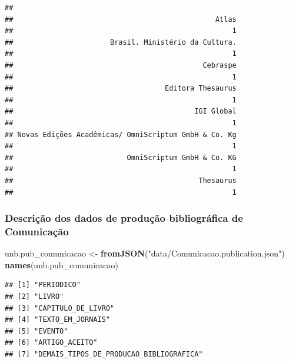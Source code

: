 \documentclass[]{article}
\newenvironment{Shaded}{\begin{snugshade}}{\end{snugshade}}
\newcommand{\KeywordTok}[1]{\textcolor[rgb]{0.13,0.29,0.53}{\textbf{#1}}}
\newcommand{\DataTypeTok}[1]{\textcolor[rgb]{0.13,0.29,0.53}{#1}}
\newcommand{\DecValTok}[1]{\textcolor[rgb]{0.00,0.00,0.81}{#1}}
\newcommand{\StringTok}[1]{\textcolor[rgb]{0.31,0.60,0.02}{#1}}
\newcommand{\OtherTok}[1]{\textcolor[rgb]{0.56,0.35,0.01}{#1}}
\newcommand{\OperatorTok}[1]{\textcolor[rgb]{0.81,0.36,0.00}{\textbf{#1}}}
\newcommand{\NormalTok}[1]{#1}
\begin{document}
\begin{Shaded}
\end{Shaded}

\begin{verbatim}
## 
##                                                Atlas 
##                                                    1 
##                       Brasil. Ministério da Cultura. 
##                                                    1 
##                                             Cebraspe 
##                                                    1 
##                                    Editora Thesaurus 
##                                                    1 
##                                           IGI Global 
##                                                    1 
## Novas Edições Acadêmicas/ OmniScriptum GmbH & Co. Kg 
##                                                    1 
##                           OmniScriptum GmbH & Co. KG 
##                                                    1 
##                                            Thesaurus 
##                                                    1
\end{verbatim}

\subsubsection{Descrição dos dados de produção bibliográfica de
Comunicação}\label{descricao-dos-dados-de-producao-bibliografica-de-comunicacao}

\begin{Shaded}
\begin{Highlighting}[]
\NormalTok{unb.pub_comunicacao <-}\StringTok{ }\KeywordTok{fromJSON}\NormalTok{(}\StringTok{"data/Comunicacao.publication.json"}\NormalTok{)}
\KeywordTok{names}\NormalTok{(unb.pub_comunicacao)}
\end{Highlighting}
\end{Shaded}

\begin{verbatim}
## [1] "PERIODICO"                             
## [2] "LIVRO"                                 
## [3] "CAPITULO_DE_LIVRO"                     
## [4] "TEXTO_EM_JORNAIS"                      
## [5] "EVENTO"                                
## [6] "ARTIGO_ACEITO"                         
## [7] "DEMAIS_TIPOS_DE_PRODUCAO_BIBLIOGRAFICA"
\end{verbatim}
\end{document}
